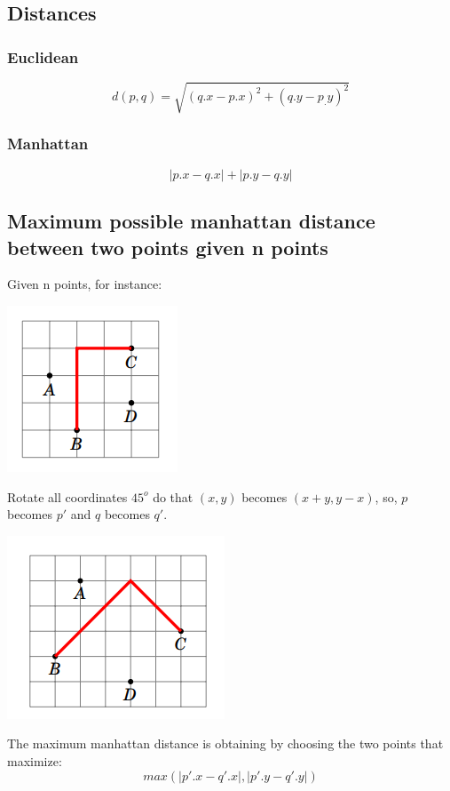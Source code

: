 \subsection{Distances}
\subsubsection{Euclidean}
$$ d(p,q)={\sqrt {(q.x-p.x)^{2}+(q.y-p_.y)^{2}}} $$
\subsubsection{Manhattan}
$$ |p.x - q.x| + |p.y - q.y| $$
\subsection{Maximum possible manhattan distance between two points given n points}
Given n points, for instance:
\begin{center}
    \includegraphics[scale=.6, keepaspectratio]{./Theory/images/manhattan_before.png}
\end{center}

Rotate all coordinates $45^{o}$ do that $(x, y)$ becomes $(x+y, y-x)$, so, $p$ becomes $p'$ and $q$ becomes $q'$.
\begin{center}
    \includegraphics[scale=.6, keepaspectratio]{./Theory/images/manhattan_after.png}
\end{center}

The maximum manhattan distance is obtaining by choosing the two points that maximize:
$$ max(|p'.x - q'.x|, |p'.y - q'.y|) $$
